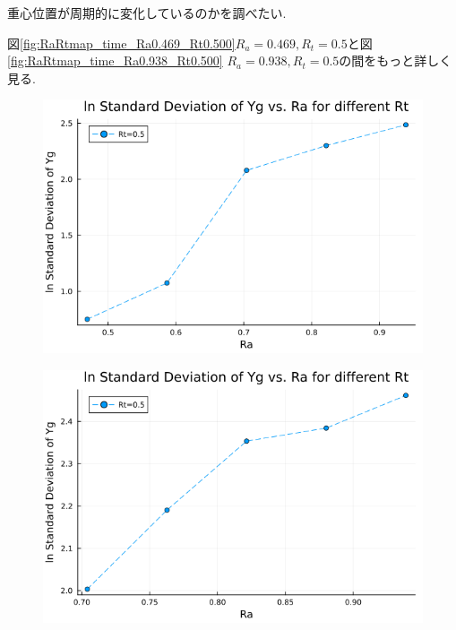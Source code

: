 重心位置が周期的に変化しているのかを調べたい.

図\ref{fig:RaRtmap_time_Ra0.469_Rt0.500}$R_a = 0.469, R_t = 0.5$と図\ref{fig:RaRtmap_time_Ra0.938_Rt0.500} $R_a = 0.938, R_t = 0.5$の間をもっと詳しく見る.



\begin{figure}[H]
  \centering
  \includegraphics[scale=0.5]{image/lnStdYg_Ra0.4693845to0.98769_Rt0.5_ti25000.png}
  \caption{}
  \label{}
\end{figure}



\begin{figure}[H]
  \centering
  \includegraphics[scale=0.5]{image/lnStdYg_Ra0.70407675to0.98769_Rt0.5_ti25000.png}
  \caption{}
  \label{}
\end{figure}

